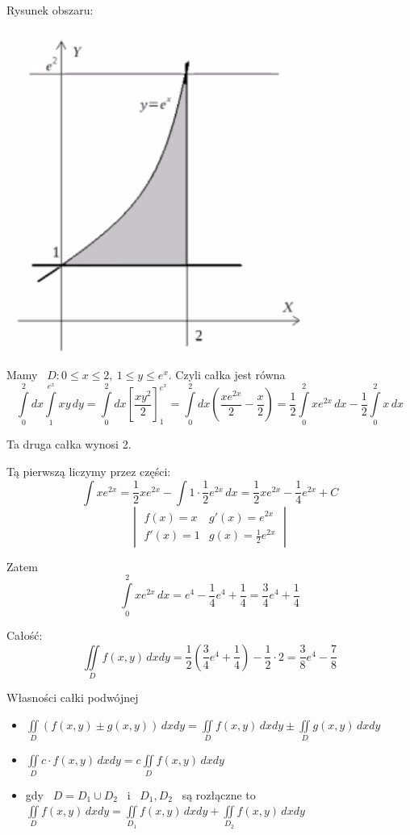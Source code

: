 \begin{center}
    Rysunek obszaru:
    
    \includegraphics[scale=0.7]{img/krzywetrojkat.png}
\end{center}

Mamy \ $ D: 0 \leq x \leq 2, \ 1 \leq y \leq e^x $. Czyli całka jest równa
\[ \int\limits_{0}^{2} dx \int\limits_{1}^{e^x} xy \, dy = \int\limits_{0}^{2} dx \left[ \frac{xy^2}{2} \right]_{1}^{e^x} 
= \int\limits_{0}^{2} dx \left( \frac{xe^{2x}}{2} - \frac{x}{2} \right) = \frac{1}{2} \int\limits_{0}^{2} xe^{2x}\, dx - \frac{1}{2} \int\limits_{0}^{2} x\, dx \]

Ta druga całka wynosi 2.

Tą pierwszą liczymy przez części:
\[ \int xe^{2x} = \frac{1}{2} xe^{2x} - \int 1 \cdot \frac{1}{2} e^{2x} \, dx = \frac{1}{2} xe^{2x} - \frac{1}{4} e^{2x} + C \]
\[ \begin{vmatrix}
    f(x) = x & g'(x) = e^{2x} \\
    f'(x) = 1 & g(x) = \frac{1}{2}e^{2x} 
\end{vmatrix} \]

Zatem
\[ \int\limits_{0}^{2} xe^{2x} \, dx = e^4 - \frac{1}{4}e^4 + \frac{1}{4} = \frac{3}{4}e^4 + \frac{1}{4} \]

Całość:
\[ \iint\limits_D f(x,y) \, dxdy = \frac{1}{2} \left( \frac{3}{4}e^4 + \frac{1}{4} \right) - \frac{1}{2} \cdot 2 = \frac{3}{8}e^4 - \frac{7}{8} \]
\bigskip

\begin{tw}{Własności całki podwójnej}
\begin{itemize}
    \item $ \iint\limits_D \left( f(x,y) \pm g(x,y) \right)\, dxdy = \iint\limits_D f(x,y)\, dxdy \pm \iint\limits_D g(x,y)\, dxdy $
    \item $ \iint\limits_D c \cdot f(x,y)\, dxdy = c \iint\limits_D f(x,y)\, dxdy $
    \item gdy \ $ D = D_1 \cup D_2 $ \ i \ $ D_1, D_2 $ \ są rozłączne to
    $ \iint\limits_D f(x,y)\, dxdy = \iint\limits_{D_1} f(x,y)\, dxdy + \iint\limits_{D_2} f(x,y)\, dxdy $
\end{itemize}
\end{tw}